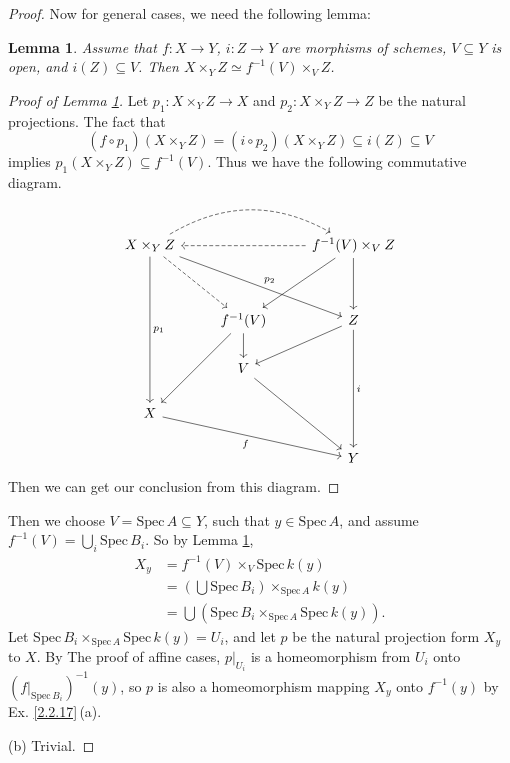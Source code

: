 \documentclass{amsart}
\newtheorem{lm}[theorem]{Lemma}
\theoremstyle{remark}\newtheorem{rmk}[theorem]{Remark}
\begin{document}
\begin{proof}
	Now for general cases, we need the following lemma:
	\begin{lm}
		\label{l12}
		Assume that $f:X\rightarrow Y$, $i:Z\rightarrow Y$ are morphisms of schemes, $V\subseteq Y$ is open, and $i(Z)\subseteq V$. Then $X\times_YZ\simeq f^{-1}(V)\times_VZ$.
	\end{lm}
    \begin{proof}[Proof of Lemma \ref*{l12}]
    	Let $p_1:X\times_YZ\to X$ and $p_2:X\times_YZ\to Z$ be the natural projections. The fact that $$(f\circ p_1)(X\times_YZ)=(i\circ p_2)(X\times_YZ)\subseteq i(Z)\subseteq V$$implies $p_1(X\times_YZ)\subseteq f^{-1}(V)$. Thus we have the following commutative diagram.
    	\begin{equation*}
    	\begin{tikzcd}
    	X\times_YZ \arrow[dddd, "p_1"] \arrow[rrdd, "p_2"] \arrow[rdd, dashed] \arrow[rr, dashed, bend left] &                                 & f^{-1}(V)\times_VZ \arrow[ldd] \arrow[dd] \arrow[ll, dashed] \\
    	&                                 &                                                              \\
    	& f^{-1}(V) \arrow[ldd] \arrow[d] & Z \arrow[ddd, "i"] \arrow[ld]                                \\
    	& V \arrow[rdd]                   &                                                              \\
    	X \arrow[rrd, "f"']                                                                                  &                                 &                                                              \\
    	&                                 & Y                                                           
    	\end{tikzcd}
    	\end{equation*}
    	Then we can get our conclusion from this diagram.
    \end{proof}
	Then we choose $V=\mathrm{Spec}\, A\subseteq Y$, such that $y\in \mathrm{Spec}\, A$, and assume $f^{-1}(V)=\bigcup_i \mathrm{Spec}\, B_i$.
	So by Lemma \ref{l12},
	\begin{align*}
	X_y&=f^{-1}(V)\times_V\mathrm{Spec}\,k(y)\\
	&=\left(\bigcup \mathrm{Spec}\, B_i\right)\times_{\mathrm{Spec}\, A}k(y)\\
	&=\bigcup (\mathrm{Spec}\, B_i\times_{\mathrm{Spec}\, A}\mathrm{Spec}\,k(y)).
	\end{align*}
	Let $\mathrm{Spec}\, B_i\times_{\mathrm{Spec}\,A}\mathrm{Spec}\,k(y)=U_i$, and let $p$ be the natural
	projection form $X_y$ to $X$. By The proof of affine cases, $p|_{U_i}$ is a homeomorphism from $U_i$ onto $(f|_{\mathrm{Spec}\, B_i})^{-1}(y)$, so $p$ is also a homeomorphism mapping $X_y$ onto $f^{-1}(y)$ by Ex. \ref{2.2.17}\,(a).
	
	(b) Trivial.
\end{proof}
\end{document}
